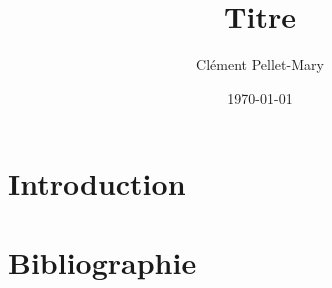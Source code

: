 \documentclass[a4paper]{article}
\title{Titre}
\author{Clément Pellet-Mary}
\date\today
\begin{document}
  \maketitle
  \newpage
  \tableofcontents
  \newpage
  \section{Introduction}
  \section{Bibliographie} %
	
	
  
\end{document}
